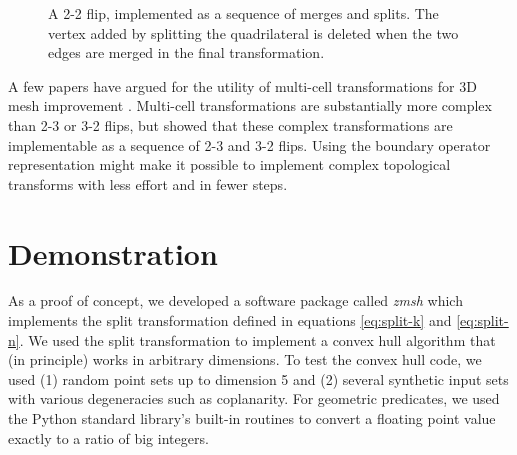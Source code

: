\documentclass[twocolumn]{article}
\begin{document}
\begin{figure}[h]
\begin{center}
    \end{center}
    \caption{A 2-2 flip, implemented as a sequence of merges and splits.
    The vertex added by splitting the quadrilateral is deleted when the two edges are merged in the final transformation.}
    \label{fig:2-2-flip}
\end{figure}

A few papers have argued for the utility of multi-cell transformations for 3D mesh improvement \cite{klingner2008aggressive}.
Multi-cell transformations are substantially more complex than 2-3 or 3-2 flips, but \cite{misztal2009tetrahedral} showed that these complex transformations are implementable as a sequence of 2-3 and 3-2 flips.
Using the boundary operator representation might make it possible to implement complex topological transforms with less effort and in fewer steps.


\section{Demonstration}

As a proof of concept, we developed a software package called \emph{zmsh}
which implements the split transformation defined in equations \eqref{eq:split-k} and \eqref{eq:split-n}.
We used the split transformation to implement a convex hull algorithm that (in principle) works in arbitrary dimensions.
To test the convex hull code, we used (1) random point sets up to dimension 5 and (2) several synthetic input sets with various degeneracies such as coplanarity.
For geometric predicates, we used the Python standard library's built-in routines to convert a floating point value exactly to a ratio of big integers.
\end{document}
